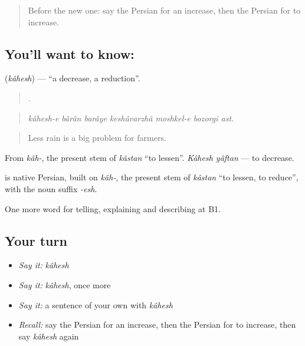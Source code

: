 \label{lesson:FA-C373-kahesh}



\begin{quote}
Before the new one: say the Persian for an increase, then the Persian for to increase.
\end{quote}

\subsection*{You'll want to know: }
\textbf{} (\emph{kâhesh}) — \textquotedblleft{}a decrease, a reduction\textquotedblright{}.

\begin{quote}
      .
\end{quote}

\begin{quote}
\emph{kâhesh-e bârân barâye keshâvarzhâ moshkel-e bozorgi ast.}
\end{quote}

\begin{quote}
Less rain is a big problem for farmers.
\end{quote}

From \emph{kâh-}, the present stem of \emph{kâstan} \textquotedblleft{}to lessen\textquotedblright{}. \emph{Kâhesh yâftan} — to decrease.

\begin{cousinweb}
\textbf{} is native Persian, built on \emph{kâh-}, the present stem of \emph{kâstan} \textquotedblleft{}to lessen, to reduce\textquotedblright{}, with the noun suffix \emph{-esh}.
\end{cousinweb}

\begin{grammarlens}[title={What you've built}]
One more word for telling, explaining and describing at B1.
\end{grammarlens}

\subsection*{Your turn}
\begin{itemize}
\raggedright
  \item \emph{Say it:} \emph{kâhesh}
  \item \emph{Say it:} \emph{kâhesh}, once more
  \item \emph{Say it:} a sentence of your own with \emph{kâhesh}
  \item \emph{Recall:} say the Persian for an increase, then the Persian for to increase, then say \emph{kâhesh} again
\end{itemize}

